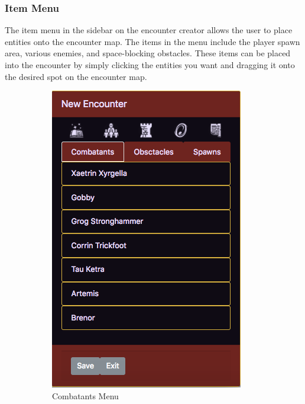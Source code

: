 \documentclass[12pt,a4paper]{report}
\begin{document}
			\subsubsection{Item Menu}
			The item menu in the sidebar on the encounter creator allows the user to place entities onto the encounter map. The items in the menu include the player spawn area, various enemies, and space-blocking obstacles. These items can be placed into the encounter by simply clicking the entities you want and dragging it onto the desired spot on the encounter map.
			\bigskip
			\begin{figure}[H]
				\centering
				\begin{subfigure}{.3\textwidth}
				\centering
				\includegraphics[scale=.37]{sidebarcombatantsmenu}
				\caption{Combatants Menu}
				\label{fig: Sidebar with Item Menu}
				\end{subfigure}%
				\begin{subfigure}{.3\textwidth}
				\centering

\end{subfigure}
\end{figure}
\end{document}
